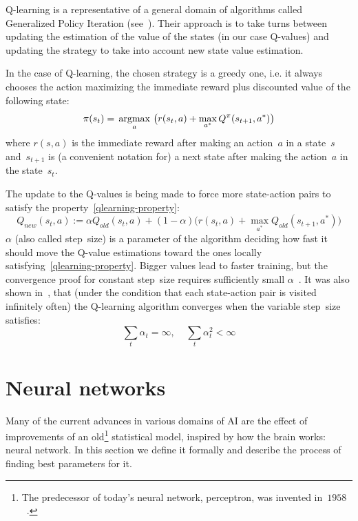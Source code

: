 Q-learning is a representative of a general domain of algorithms called Generalized Policy Iteration (see~\cite[Chapter~4.6.]{reinforcement-book}). Their approach is to take turns between updating the estimation of the value of the states (in our case Q-values) and updating the strategy to take into account new state value estimation.
 
In the case of Q-learning, the chosen strategy is a greedy one, i.e. it always chooses the action maximizing the immediate reward plus discounted value of the following state:
\begin{equation}
  \pi(s_t) = \operatorname*{\,\operatorname{argmax}\,}_a \big(r(s_t, a) + \max_{a^*} Q^\pi(s_{t+1}, a^*)\big)
\end{equation}
where $r(s, a)$ is the immediate reward after making an action~$a$ in a state~$s$ and~$s_{t+1}$ is (a convenient notation for) a next state after making the action~$a$ in the state~$s_t$.

The update to the Q-values is being made to force more state-action pairs to satisfy the property~\eqref{qlearning-property}:
\begin{equation}
  Q_{new}(s_t, a) := \alpha Q_{old}(s_t, a) + (1 - \alpha)\big(r(s_t, a) + \max_{a^*} Q_{old}(s_{t+1}, a^*)\big)
\end{equation}
$\alpha$ (also called step~size) is a parameter of the algorithm deciding how fast it should move the Q-value estimations toward the ones locally satisfying~\eqref{qlearning-property}. Bigger values lead to faster training, but the convergence proof for constant step~size requires sufficiently small $\alpha$~\cite[section~3.]{qlearning}. It was also shown in~\cite{qlearning-convergence}, that (under the condition that each state-action pair is visited infinitely often) the Q-learning algorithm converges when the variable step~size satisfies:
\begin{equation}
  \sum_t \alpha_t = \infty, \;\;\;\; \sum_t \alpha_t^2 < \infty
\end{equation}


\section{Neural networks}
Many of the current advances in various domains of AI are the effect of improvements of an old\footnote{The predecessor of today's neural network, perceptron, was invented in~$1958$~\cite{perceptron}.} statistical model, inspired by how the brain works: neural network. In this section we define it formally and describe the process of finding best parameters for it.

